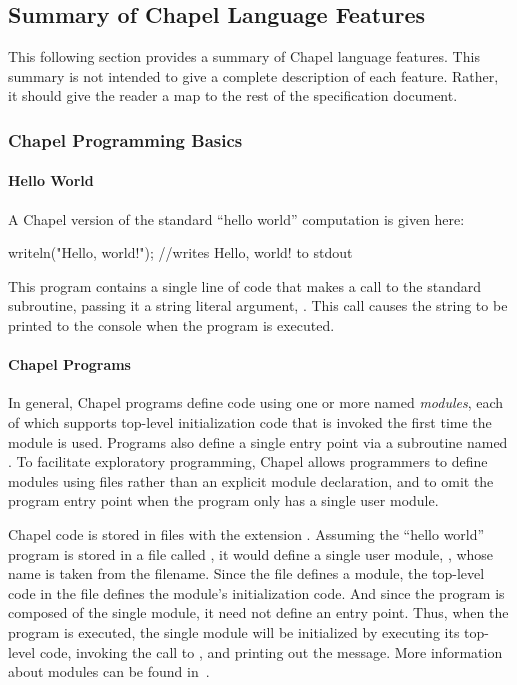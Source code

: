 \subsection{Summary of Chapel Language Features}

This following section provides a summary of Chapel language features.  
This summary is not intended to give a complete description of each feature.
Rather, it should give the reader a map to the rest of the specification
document.  

\subsubsection{Chapel Programming Basics}
\paragraph{Hello World} 
A Chapel version of the standard ``hello world'' computation is given
here:
\begin{chapel}
writeln("Hello, world!"); //writes Hello, world! to stdout
\end{chapel}
\noindent This program contains a single line of code that makes a
call to the standard  subroutine, passing it a string
literal argument, .  This call causes the string
to be printed to the console when the program is executed.

\paragraph{Chapel Programs}

In general, Chapel programs define code using one or more named
\emph{modules}, each of which supports top-level initialization code
that is invoked the first time the module is used.  Programs also
define a single entry point via a subroutine named .  To
facilitate exploratory programming, Chapel allows programmers to
define modules using files rather than an explicit module declaration,
and to omit the program entry point when the program only has a single
user module.  

Chapel code is stored in files with the extension .
Assuming the ``hello world'' program is stored in a file called 
, it
would define a single user module, , whose name is taken
from the filename.  Since the file defines a module, the top-level
code in the file defines the module's initialization code.  And since
the program is composed of the single  module, it need not
define an entry point.  Thus, when the program is executed, the single
 module will be initialized by executing its top-level
code, invoking the call to , and printing out the
message.  More information about modules can be found in~. 

